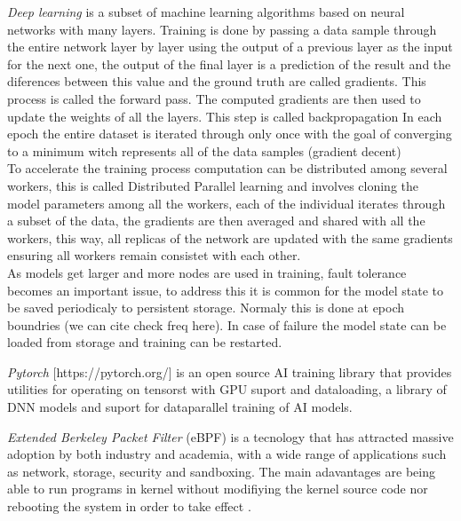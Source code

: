 \documentclass[conference]{IEEEtran}
\begin{document}
    \textit{Deep learning} is a subset of machine learning algorithms based on neural networks with many layers. Training is done by passing a data sample 
    through the entire network layer by layer using the output of a previous layer as the input for the next one, the output of the final layer is a prediction of the result 
    and the diferences between this value and the ground truth are called gradients. This process is called the forward pass. 
    The computed gradients are then used to update the weights of all the layers. This step is called backpropagation
    In each epoch the entire dataset is iterated through only once with the goal of converging to a minimum witch represents all of the data samples (gradient decent) \\
    To accelerate the training process computation can be distributed among several workers, this is called Distributed Parallel learning and involves cloning
    the model parameters among all the workers, each of the individual iterates through a subset of the data, the gradients are then averaged and shared with all the workers,
    this way, all replicas of the network are updated with the same gradients ensuring all workers remain consistet with each other. \\
    As models get larger and more nodes are used in training, fault tolerance becomes an important issue, to address this it is common for the model state to be
    saved periodicaly to persistent storage. Normaly this is done at epoch boundries (we can cite check freq here). In case of failure the model state can be loaded from
    storage and training can be restarted. 
    
    \textit{Pytorch} [https://pytorch.org/] is an open source AI training library that provides utilities for operating on tensorst with GPU suport and dataloading, a library of
    DNN models and suport for dataparallel training of AI models.

    \textit{Extended Berkeley Packet Filter} (eBPF) is a tecnology that has attracted massive adoption by both industry and academia, with a wide range of applications such as network, storage, security and sandboxing. 
    The main adavantages are being able to run programs in kernel without modifiying the kernel source code nor rebooting the system in order to take effect \cite{eBPFSurvey}.
\end{document}
